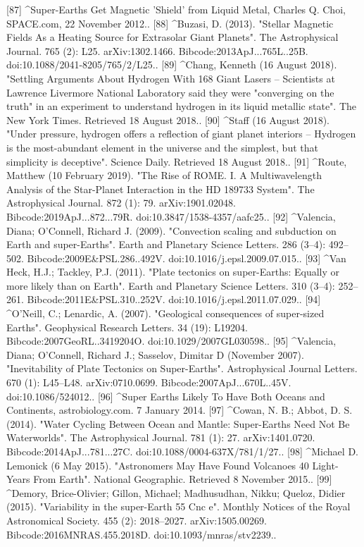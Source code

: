 [87]
^Super-Earths Get Magnetic 'Shield' from Liquid Metal, Charles Q. Choi, SPACE.com, 22 November 2012..
[88]
^Buzasi, D. (2013). "Stellar Magnetic Fields As a Heating Source for Extrasolar Giant Planets". The Astrophysical Journal. 765 (2): L25. arXiv:1302.1466. Bibcode:2013ApJ...765L..25B. doi:10.1088/2041-8205/765/2/L25..
[89]
^Chang, Kenneth (16 August 2018). "Settling Arguments About Hydrogen With 168 Giant Lasers – Scientists at Lawrence Livermore National Laboratory said they were "converging on the truth" in an experiment to understand hydrogen in its liquid metallic state". The New York Times. Retrieved 18 August 2018..
[90]
^Staff (16 August 2018). "Under pressure, hydrogen offers a reflection of giant planet interiors – Hydrogen is the most-abundant element in the universe and the simplest, but that simplicity is deceptive". Science Daily. Retrieved 18 August 2018..
[91]
^Route, Matthew (10 February 2019). "The Rise of ROME. I. A Multiwavelength Analysis of the Star-Planet Interaction in the HD 189733 System". The Astrophysical Journal. 872 (1): 79. arXiv:1901.02048. Bibcode:2019ApJ...872...79R. doi:10.3847/1538-4357/aafc25..
[92]
^Valencia, Diana; O'Connell, Richard J. (2009). "Convection scaling and subduction on Earth and super-Earths". Earth and Planetary Science Letters. 286 (3–4): 492–502. Bibcode:2009E&PSL.286..492V. doi:10.1016/j.epsl.2009.07.015..
[93]
^Van Heck, H.J.; Tackley, P.J. (2011). "Plate tectonics on super-Earths: Equally or more likely than on Earth". Earth and Planetary Science Letters. 310 (3–4): 252–261. Bibcode:2011E&PSL.310..252V. doi:10.1016/j.epsl.2011.07.029..
[94]
^O'Neill, C.; Lenardic, A. (2007). "Geological consequences of super-sized Earths". Geophysical Research Letters. 34 (19): L19204. Bibcode:2007GeoRL..3419204O. doi:10.1029/2007GL030598..
[95]
^Valencia, Diana; O'Connell, Richard J.; Sasselov, Dimitar D (November 2007). "Inevitability of Plate Tectonics on Super-Earths". Astrophysical Journal Letters. 670 (1): L45–L48. arXiv:0710.0699. Bibcode:2007ApJ...670L..45V. doi:10.1086/524012..
[96]
^Super Earths Likely To Have Both Oceans and Continents, astrobiology.com. 7 January 2014.
[97]
^Cowan, N. B.; Abbot, D. S. (2014). "Water Cycling Between Ocean and Mantle: Super-Earths Need Not Be Waterworlds". The Astrophysical Journal. 781 (1): 27. arXiv:1401.0720. Bibcode:2014ApJ...781...27C. doi:10.1088/0004-637X/781/1/27..
[98]
^Michael D. Lemonick (6 May 2015). "Astronomers May Have Found Volcanoes 40 Light-Years From Earth". National Geographic. Retrieved 8 November 2015..
[99]
^Demory, Brice-Olivier; Gillon, Michael; Madhusudhan, Nikku; Queloz, Didier (2015). "Variability in the super-Earth 55 Cnc e". Monthly Notices of the Royal Astronomical Society. 455 (2): 2018–2027. arXiv:1505.00269. Bibcode:2016MNRAS.455.2018D. doi:10.1093/mnras/stv2239..
